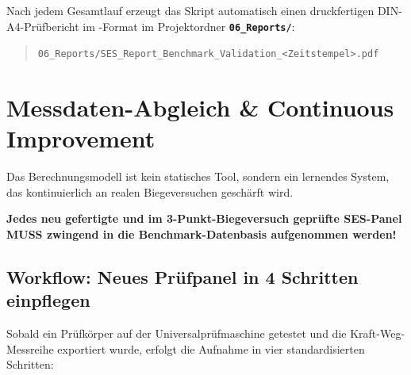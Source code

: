 Nach jedem Gesamtlauf erzeugt das Skript automatisch einen druckfertigen DIN-A4-Prüfbericht im -Format im Projektordner \textbf{\texttt{06\_Reports/}}:
\begin{quote}
    \texttt{06\_Reports/SES\_Report\_Benchmark\_Validation\_<Zeitstempel>.pdf}
\end{quote}

\section{Messdaten-Abgleich \& Continuous Improvement} \label{sec:continuous_improvement}

Das Berechnungsmodell ist kein statisches Tool, sondern ein lernendes System, das kontinuierlich an realen Biegeversuchen geschärft wird.

\begin{tcolorbox}[colback=warnbg,colframe=warnred,arc=2mm,title=\textbf{Wichtiger Leitsatz: Pflicht zur lückenlosen Panel-Aufnahme}]
\textbf{Jedes neu gefertigte und im 3-Punkt-Biegeversuch geprüfte SES-Panel MUSS zwingend in die Benchmark-Datenbasis aufgenommen werden!} \par \vspace{0.5em}
\end{tcolorbox}

\subsection*{Workflow: Neues Prüfpanel in 4 Schritten einpflegen}
Sobald ein Prüfkörper auf der Universalprüfmaschine getestet und die Kraft-Weg-Messreihe exportiert wurde, erfolgt die Aufnahme in vier standardisierten Schritten:

